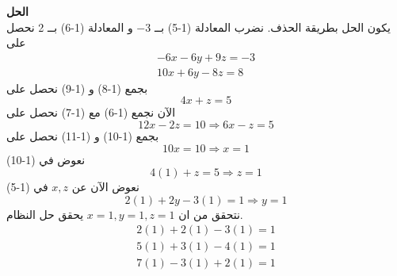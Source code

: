 	\noindent
	\textbf{الحل}\\
	\noindent
	يكون الحل بطريقة الحذف. نضرب المعادلة (1-5) بــ $-3$ و المعادلة (1-6) بــ 2
	نحصل على 
	\begin{gather}
		-6x -6y +9z =-3\\
		10x + 6y -8z =8
	\end{gather}
	بجمع (1-8) و (1-9) نحصل على 
	\begin{equation}
		4x + z =5
	\end{equation}
	الآن نجمع (1-6) مع (1-7) نحصل على
	\begin{equation}
		12x -2z = 10 \Rightarrow 6x - z = 5  
	\end{equation}
	بجمع (1-10) و (1-11) نحصل على
	\[
	10x = 10 \Rightarrow x=1
	\]
	نعوض في (1-10)
	\[
	4(1) + z = 5 \Rightarrow z=1
	\]
	نعوض الآن عن $x, z$ في (1-5)
	\[
	2(1) + 2y - 3(1) = 1 \Rightarrow y =1
	\]
	نتحقق من ان  $x=1, y=1,z=1$ يحقق حل النظام.
	\begin{gather*}
		2(1) + 2(1)- 3(1) =1\\
		5(1)+3(1)-4(1)=1\\
		7(1)-3(1)+2(1)=1
	\end{gather*}

